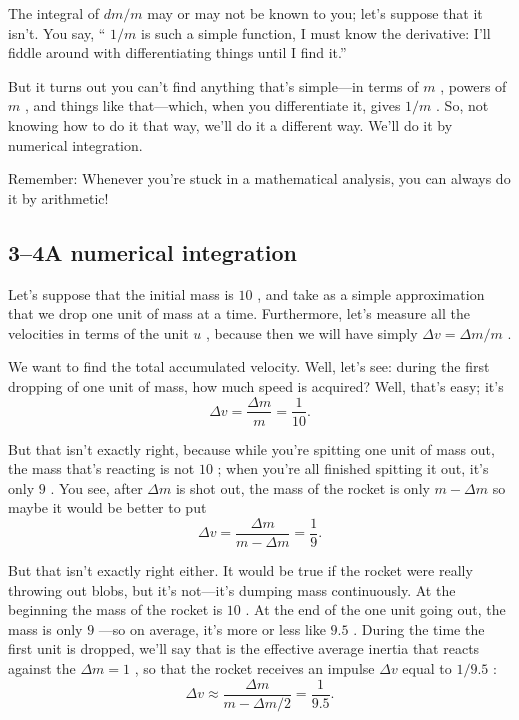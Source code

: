 \documentclass[11pt,oneside]{article}
\begin{document}
The integral of \(dm/m\) may or may not be known to you; let's suppose that it isn't. You say, `` \(1/m\) is such a simple function, I must know the derivative: I'll fiddle around with differentiating things until I find it.''\par

But it turns out you can't find anything that's simple---in terms of \(m\) , powers of \(m\) , and things like that---which, when you differentiate it, gives \(1/m\) . So, not knowing how to do it that way, we'll do it a different way. We'll do it by numerical integration.\par

Remember: Whenever you're stuck in a mathematical analysis, you can always do it by arithmetic!\par

\subsection*{3--4A numerical integration}

Let's suppose that the initial mass is \(10\) , and take as a simple approximation that we drop one unit of mass at a time. Furthermore, let's measure all the velocities in terms of the unit \(u\) , because then we will have simply \(\Delta v = \Delta m/m\) .\par

We want to find the total accumulated velocity. Well, let's see: during the first dropping of one unit of mass, how much speed is acquired? Well, that's easy; it's 
\begin{equation*} \Delta v = \frac{\Delta m}{m} = \frac{1}{10}. \end{equation*}
\par

But that isn't exactly right, because while you're spitting one unit of mass out, the mass that's reacting is not \(10\) ; when you're all finished spitting it out, it's only \(9\) . You see, after \(\Delta m\) is shot out, the mass of the rocket is only \(m - \Delta m\) so maybe it would be better to put 
\begin{equation*} \Delta v = \frac{\Delta m}{m - \Delta m} = \frac{1}{9}. \end{equation*}
\par

But that isn't exactly right either. It would be true if the rocket were really throwing out blobs, but it's not---it's dumping mass continuously. At the beginning the mass of the rocket is \(10\) . At the end of the one unit going out, the mass is only \(9\) ---so on average, it's more or less like \(9.5\) . During the time the first unit is dropped, we'll say that is the effective average inertia that reacts against the \(\Delta m = 1\) , so that the rocket receives an impulse \(\Delta v\) equal to \(1/9.5\) : 
\begin{equation*} \Delta v \approx \frac{\Delta m}{m - \Delta m/2} = \frac{1}{9.5}. \end{equation*}
\par
\end{document}
